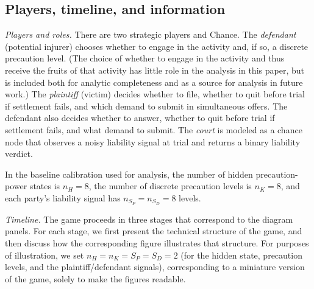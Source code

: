 \documentclass{article}
\begin{document}
\subsection{Players, timeline, and information}
\emph{Players and roles.} There are two strategic players and Chance. The \emph{defendant} (potential injurer) chooses whether to engage in the activity and, if so, a discrete precaution level. (The choice of whether to engage in the activity and thus receive the fruits of that activity has little role in the analysis in this paper, but is included both for analytic completeness and as a source for analysis in future work.) The \emph{plaintiff} (victim) decides whether to file, whether to quit before trial if settlement fails, and which demand to submit in simultaneous offers. The defendant also decides whether to answer, whether to quit before trial if settlement fails, and what demand to submit. The \emph{court} is modeled as a chance node that observes a noisy liability signal at trial and returns a binary liability verdict.

In the baseline calibration used for analysis, the number of hidden precaution-power states is $n_H=8$, the number of discrete precaution levels is $n_K=8$, and each party’s liability signal has $n_{S_P}=n_{S_D}=8$ levels. 

\emph{Timeline.} The game proceeds in three stages that correspond to the diagram panels. For each stage, we first present the technical structure of the game, and then discuss how the corresponding figure illustrates that structure. For purposes of illustration, we set $n_H = n_K = S_P = S_D = 2$ (for the hidden state, precaution levels, and the plaintiff/defendant signals), corresponding to a miniature version of the game, solely to make the figures readable.
\end{document}
